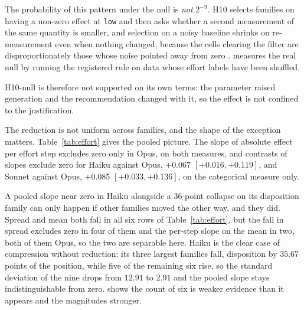 The probability of this pattern under the null is \textit{not} $2^{-9}$.
H10 selects families on having a non-zero effect at \texttt{low} and then
asks whether a second measurement of the same quantity is smaller, and
selection on a noisy baseline shrinks on re-measurement even when nothing
changed, because the cells clearing the filter are disproportionately those
whose noise pointed away from zero \citep{barnett2005regression}.
\ifsubmission\else
{} measures the real null by running the registered
rule on data whose effort labels have been shuffled.
\fi

H10-null is therefore not supported on its own terms: the parameter raised
generation and the recommendation changed with it, so the effect is not
confined to the justification.

The reduction is not uniform across families, and the shape of the exception
matters. Table~\ref{tab:effort} gives the pooled picture. The slope of
absolute effect per effort step excludes zero only in Opus, on both measures,
and contrasts of slopes exclude zero for Haiku against Opus, $+0.067$
$[+0.016, +0.119]$, and Sonnet against Opus, $+0.085$ $[+0.033, +0.136]$, on
the categorical measure only.

A pooled slope near zero in Haiku alongside a 36-point collapse on its
disposition family can only happen if other families moved the other way,
and they did. Spread and mean both fall in all six rows of
Table~\ref{tab:effort}, but the fall in spread excludes zero in four of them
and the per-step slope on the mean in two, both of them Opus, so the two are
separable here. Haiku is the clear case of compression without reduction:
its three largest families fall, disposition by $35.67$ points of the
position, while five of the remaining six rise, so the standard deviation of
the nine drops from $12.91$ to $2.91$ and the pooled slope stays
indistinguishable from
zero.
 shows the count of six is weaker evidence than it
appears and the magnitudes stronger.

